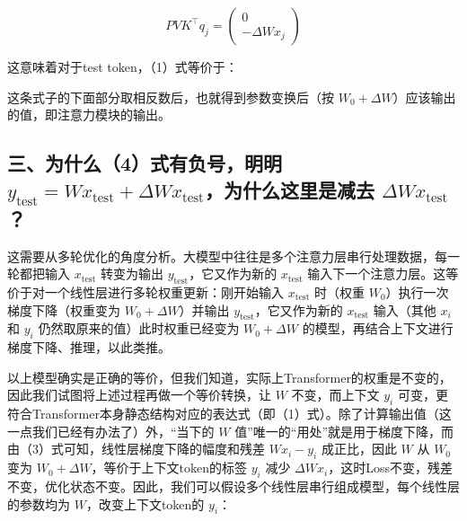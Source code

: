 \[
PVK^\top q_j=\begin{pmatrix}0\\-\Delta W x_j\end{pmatrix}
\]

这意味着对于test token，（1）式等价于：

这条式子的下面部分取相反数后，也就得到参数变换后（按 \(W_0+\Delta W\)）应该输出的值，即注意力模块的输出。

\hypertarget{ux4e09ux4e3aux4ec0ux4e484ux5f0fux6709ux8d1fux53f7ux660eux660e-y_mathrmtestwx_mathrmtestdelta-wx_mathrmtestux4e3aux4ec0ux4e48ux8fd9ux91ccux662fux51cfux53bb-delta-wx_mathrmtest}{%
\subsection{\texorpdfstring{三、为什么（4）式有负号，明明 \(y_{\mathrm{test}}=Wx_{\mathrm{test}}+\Delta Wx_{\mathrm{test}}\)，为什么这里是减去 \(\Delta Wx_{\mathrm{test}}\)？}{三、为什么（4）式有负号，明明 y\_\{\textbackslash mathrm\{test\}\}=Wx\_\{\textbackslash mathrm\{test\}\}+\textbackslash Delta Wx\_\{\textbackslash mathrm\{test\}\}，为什么这里是减去 \textbackslash Delta Wx\_\{\textbackslash mathrm\{test\}\}？}}\label{ux4e09ux4e3aux4ec0ux4e484ux5f0fux6709ux8d1fux53f7ux660eux660e-y_mathrmtestwx_mathrmtestdelta-wx_mathrmtestux4e3aux4ec0ux4e48ux8fd9ux91ccux662fux51cfux53bb-delta-wx_mathrmtest}}

这需要从多轮优化的角度分析。大模型中往往是多个注意力层串行处理数据，每一轮都把输入 \(x_{\mathrm{test}}\) 转变为输出 \(y_{\mathrm{test}}\)，它又作为新的 \(x_{\mathrm{test}}\) 输入下一个注意力层。这等价于对一个线性层进行多轮权重更新：刚开始输入 \(x_{\mathrm{test}}\) 时（权重 \(W_0\)）执行一次梯度下降（权重变为 \(W_0+\Delta W\)）并输出 \(y_{\mathrm{test}}\)，它又作为新的 \(x_{\mathrm{test}}\) 输入（其他 \(x_i\) 和 \(y_i\) 仍然取原来的值）此时权重已经变为 \(W_0+\Delta W\) 的模型，再结合上下文进行梯度下降、推理，以此类推。

以上模型确实是正确的等价，但我们知道，实际上Transformer的权重是不变的，因此我们试图将上述过程再做一个等价转换，让 \(W\) 不变，而上下文 \(y_i\) 可变，更符合Transformer本身静态结构对应的表达式（即（1）式）。除了计算输出值（这一点我们已经有办法了）外，``当下的 \(W\) 值''唯一的``用处''就是用于梯度下降，而由（3）式可知，线性层梯度下降的幅度和残差 \(Wx_i-y_i\) 成正比，因此 \(W\) 从 \(W_0\) 变为 \(W_0+\Delta W\)，等价于上下文token的标签 \(y_i\) 减少 \(\Delta Wx_i\)，这时Loss不变，残差不变，优化状态不变。因此，我们可以假设多个线性层串行组成模型，每个线性层的参数均为 \(W\)，改变上下文token的 \(y_i\)：

